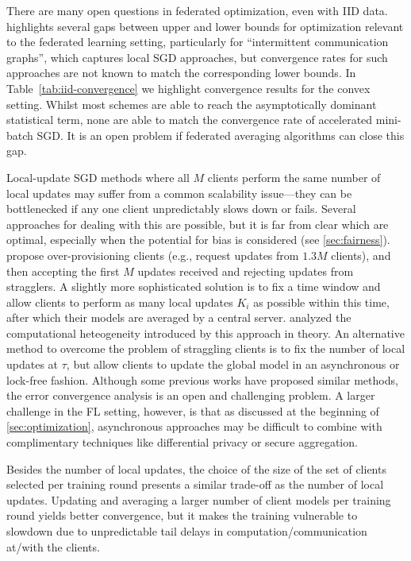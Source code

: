 \documentclass[11pt]{article}
\begin{document}

There are many open questions in federated optimization, even with IID data. 
\citet{woodworth18graphoracle} highlights several gaps between upper and lower bounds for optimization relevant to the federated learning setting, particularly for ``intermittent communication graphs'', which captures local SGD approaches, but convergence rates for such approaches are not known to match the corresponding lower bounds. In Table~\ref{tab:iid-convergence} we highlight convergence results for the convex setting. Whilst most schemes are able to reach the asymptotically dominant statistical term, none are able to match the convergence rate of accelerated mini-batch SGD. It is an open problem if federated averaging algorithms can close this gap.

Local-update SGD methods where all $M$ clients perform the same number of local updates may suffer from a common scalability issue---they can be bottlenecked if any one client unpredictably slows down or fails. Several approaches for dealing with this are possible, but it is far from clear which are optimal, especially when the potential for bias is considered (see \cref{sec:fairness}). \citet{bonawitz19sysml} propose over-provisioning clients (e.g., request updates from $1.3 M$ clients), and then accepting the first $M$ updates received and rejecting updates from stragglers. A slightly more sophisticated solution is to fix a time window and allow clients to perform as many local updates $K_i$ as possible within this time, after which their models are averaged by a central server. \citet{wang2020tackling} analyzed the computational heteogeneity introduced by this approach in theory. An alternative method to overcome the problem of straggling clients is to fix the number of local updates at $\tau$, but allow clients to update the global model in an asynchronous or lock-free fashion. Although some previous works \citep{zhang2015deep, Lian2018, dutta2018slow} have proposed similar methods, the error convergence analysis is an open and challenging problem. A larger challenge in the FL setting, however, is that as discussed at the beginning of \cref{sec:optimization}, asynchronous approaches may be difficult to combine with complimentary techniques like differential privacy or secure aggregation. 

Besides the number of local updates, the choice of the size of the set of clients selected per training round presents a similar trade-off as the number of local updates. Updating and averaging a larger number of client models per training round yields better convergence, but it makes the training vulnerable to slowdown due to unpredictable tail delays in computation/communication at/with the clients. 
\end{document}
